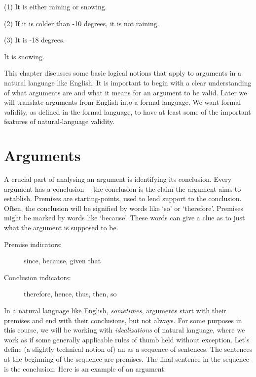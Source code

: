 \label{argSnowing}
\begin{earg}
  \item[(1)] It is either raining or snowing.
  \item[(2)] If it is colder than -10 degrees, it is not raining.
  \item[(3)] It is -18 degrees.
  \item[\therefore] It is snowing.
\end{earg}
 
This chapter discusses some basic logical notions that apply to arguments in a natural language like English.
It is important to begin with a clear understanding of what arguments are and what it means for an argument to be valid.
Later we will translate arguments from English into a formal language.
We want formal validity, as defined in the formal language, to have at least some of the important features of natural-language validity.




\section{Arguments}

A crucial part of analysing an argument is identifying its conclusion.
Every argument has a conclusion--- the conclusion is the claim the argument aims to establish.
Premises are starting-points, used to lend support to the conclusion.
Often, the conclusion will be signified by words like `so' or `therefore'.
Premises might be marked by words like `because'.
These words can give a clue as to just what the argument is supposed to be.

\begin{description}
  \item[Premise indicators:] since, because, given that
  \item[Conclusion indicators:] therefore, hence, thus, then, so
\end{description}

In a natural language like English, \emph{sometimes}, arguments start with their premises and end with their conclusions, but not always.
For some purposes in this course, we will be working with \emph{idealizations} of natural language, where we work as if some generally applicable rules of thumb held without exception.
Let's define (a slightly technical notion of) an  as a sequence of sentences.
The sentences at the beginning of the sequence are premises.
The final sentence in the sequence is the conclusion.
Here is an example of an argument:

